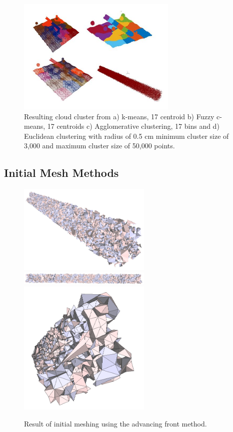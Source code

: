 \documentclass[12pt]{drexelthesis}
\let\Oldsubsection\subsection
\renewcommand{\subsection}{\FloatBarrier\Oldsubsection}
\begin{document}
\begin{figure}[!ht]
	
	\centering
		\includegraphics[width=3in]{simulated-lab-scan/2cmnoise/comparison.jpg}
		\caption[Comparison of unsupervised segmentation techniques on simulated dataset with induced noise.]{\centering Resulting cloud cluster from a) k-means, 17 centroid b) Fuzzy c-means, 17 centroids c) Agglomerative clustering, 17 bins and d) Euclidean clustering with radius of 0.5 cm minimum cluster size of 3,000 and maximum cluster size of 50,000 points.}
\label{2cmnoise:segcompare}
\end{figure}


\subsection{Initial Mesh Methods}

\begin{figure}[!ht]
	
	\centering
		\includegraphics[width=2.5in]{simulated-lab-scan/2cmnoise/2cmmesh/advancingfront00.png}
		\includegraphics[width=2.5in]{simulated-lab-scan/2cmnoise/2cmmesh/advancingfront01.png}
		\includegraphics[width=2.5in]{simulated-lab-scan/2cmnoise/2cmmesh/advancingfront02.png}
		\caption[Initial meshing using a raw advancing front approach]{\centering  Result of initial meshing using the advancing front method.}
		\label{2cmnoise:advancingfront}
\end{figure}
\end{document}
